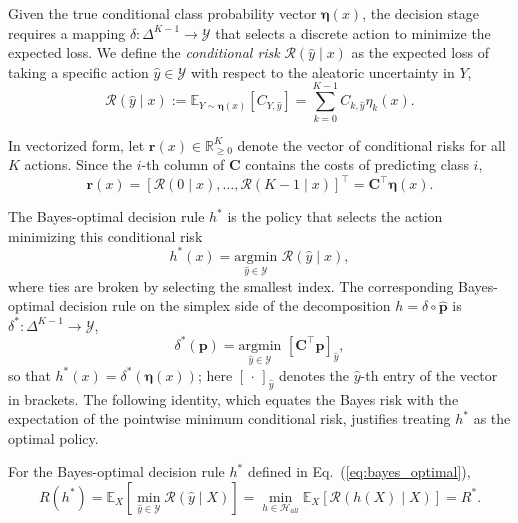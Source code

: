 Given the true conditional class probability vector $\boldsymbol{\eta}(x)$, the decision stage requires a mapping $\delta: \Delta^{K-1} \to \mathcal{Y}$ that selects a discrete action to minimize the expected loss. We define the \textit{conditional risk} $\mathcal{R}(\hat{y} \mid x)$ as the expected loss of taking a specific action $\hat{y} \in \mathcal{Y}$ with respect to the aleatoric uncertainty in $Y$,
\begin{equation}\label{eq:conditional_risk}
    \mathcal{R}(\hat{y} \mid x) := \mathbb{E}_{Y \sim \boldsymbol{\eta}(x)} [C_{Y, \hat{y}}] = \sum_{k=0}^{K-1} C_{k, \hat{y}} \eta_k(x).
\end{equation}

In vectorized form, let $\mathbf{r}(x) \in \mathbb{R}_{\geq 0}^K$ denote the vector of conditional risks for all $K$ actions. Since the $i$-th column of $\mathbf{C}$ contains the costs of predicting class $i$,
\begin{equation}
    \mathbf{r}(x) = \left[ \mathcal{R}(0 \mid x), \dots, \mathcal{R}(K-1 \mid x) \right]^\top = \mathbf{C}^\top \boldsymbol{\eta}(x).
\end{equation}

The Bayes-optimal decision rule $h^*$ is the policy that selects the action minimizing this conditional risk
\begin{equation}\label{eq:bayes_optimal}
    h^*(x) = \underset{\hat{y} \in \mathcal{Y}}{\mathrm{argmin}} \,\, \mathcal{R}(\hat{y} \mid x),
\end{equation}
where ties are broken by selecting the smallest index. The corresponding Bayes-optimal decision rule on the simplex side of the decomposition $h = \delta \circ \hat{\mathbf{p}}$ is $\delta^*: \Delta^{K-1} \to \mathcal{Y}$,
\begin{equation}\label{eq:bayes_optimal_delta}
    \delta^*(\mathbf{p}) = \underset{\hat{y} \in \mathcal{Y}}{\mathrm{argmin}} \,\, [\mathbf{C}^\top \mathbf{p}]_{\hat{y}},
\end{equation}
so that $h^*(x) = \delta^*(\boldsymbol{\eta}(x))$; here $[\,\cdot\,]_{\hat{y}}$ denotes the $\hat{y}$-th entry of the vector in brackets. The following identity, which equates the Bayes risk with the expectation of the pointwise minimum conditional risk, justifies treating $h^*$ as the optimal policy.

\begin{proposition}\label{prop:bayes_risk_identity}
For the Bayes-optimal decision rule $h^*$ defined in Eq.~(\ref{eq:bayes_optimal}),
\begin{equation}\label{eq:bayes_risk_identity}
    R(h^*) = \mathbb{E}_X \left[ \min_{\hat{y} \in \mathcal{Y}} \mathcal{R}(\hat{y} \mid X) \right] = \min_{h \in \mathcal{H}_{all}} \mathbb{E}_X \left[ \mathcal{R}(h(X) \mid X) \right] = R^*.
\end{equation}
\end{proposition}

